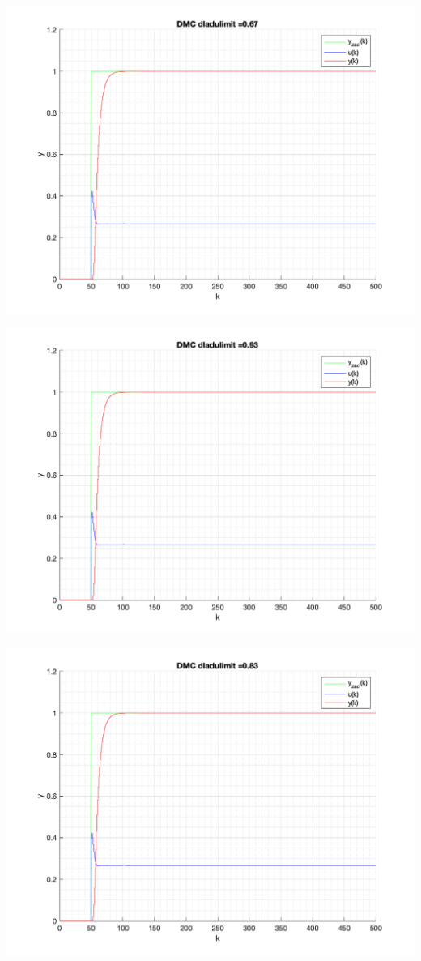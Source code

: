 \documentclass[a4paper, 11pt]{article}
\begin{document}
\begin{enumerate}
 \includegraphics[width=\linewidth]{./ModelsP6_dulimit/P4_DMC_dulimit_0_67_png.png} 
 
 \includegraphics[width=\linewidth]{./ModelsP6_dulimit/P4_DMC_dulimit_0_93_png.png} 
 
 \includegraphics[width=\linewidth]{./ModelsP6_dulimit/P4_DMC_dulimit_0_83_png.png} 
 

\end{enumerate}
\end{document}
